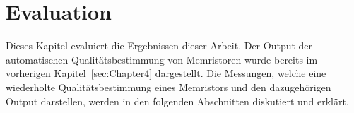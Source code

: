 

\chapter{Evaluation}
\label{sec:Chapter5}
Dieses Kapitel evaluiert die Ergebnissen dieser Arbeit. Der Output der automatischen Qualitätsbestimmung von Memristoren wurde bereits im vorherigen Kapitel~\ref{sec:Chapter4} dargestellt. Die Messungen, welche eine wiederholte Qualitätsbestimmung eines Memristors und den dazugehörigen Output darstellen, werden in den folgenden Abschnitten diskutiert und erklärt.

